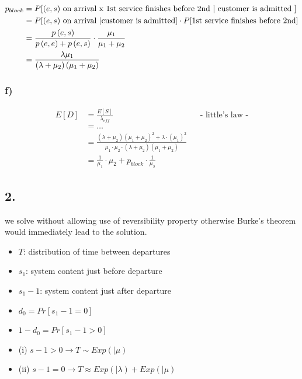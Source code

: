 \begin{align*}
p_{block} &= P[(e,s) \text{ on arrival x 1st service finishes before 2nd } | \text{ customer is admitted }]\\
&= P[(e,s) \text{ on arrival \textbar customer is admitted} ] \cdot P[\text{1st service finishes before 2nd}]\\ 
&= \frac{p\left(e,s\right)}{p\left(e,e\right)+p\left(e,s\right)}\cdot \frac{\mu _{1}}{\mu _{1}+\mu _{2}}\\
&= \frac { \lambda \mu _ { 1 } } { \left( \lambda + \mu _ { 2 } \right) \left( \mu _ { 1 } + \mu _ { 2 } \right) }
\end{align*}

\subsubsection*{f)}

\begin{align*}
E\left[D\right]&=\frac{E\left[S\right]}{\lambda _{eff}}&& \text{-  little's law -}\\
&=\ldots \\
&=\frac{\left(\lambda +\mu _{2}\right)\left(\mu _{1}+\mu _{2}\right)^{2}+\lambda \cdot \left(\mu _{1}\right)^{2}}{\mu _{1}\cdot \mu _{2}\cdot \left(\lambda +\mu _{2}\right)\left(\mu _{1}+\mu _{2}\right)}\\
&=\frac{1}{\mu _{1}}\cdot \mu _{2}+p_{block}\cdot \frac{1}{\mu _{2}}
\end{align*}


\subsection*{2.}

we solve without allowing use of reversibility property otherwise Burke's theorem
would immediately lead to the solution.

\begin{itemize}
\item  $T$: distribution of time between departures
\item  $s_{1}$: system content just before departure
\item  $s_{1}-1$: system content just after departure
\item  $d_{0}=Pr\left[s_{1}-1=0\right]$
\item  $1-d_{0}=Pr\left[s_{1}-1> 0\right]$
\end{itemize}

\begin{itemize}
\item  (i) $s-1> 0\rightarrow T\sim Exp \left(|\mu\right)$
\item  (ii) $s-1=0\rightarrow T\approx Exp \left(|\lambda\right)+Exp \left(|\mu\right)$
\end{itemize}

